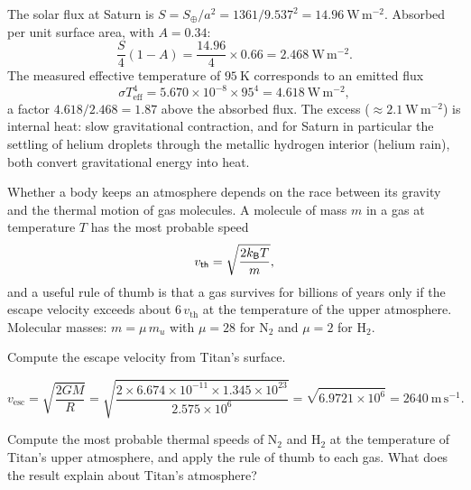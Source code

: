\begin{solution}
The solar flux at Saturn is $S = S_\oplus/a^2 = 1361/9.537^2 = 14.96\ \mathrm{W\,m^{-2}}$.
Absorbed per unit surface area, with $A = 0.34$:
\[
  \frac{S}{4}(1 - A) = \frac{14.96}{4} \times 0.66 = 2.468\ \mathrm{W\,m^{-2}}.
\]
The measured effective temperature of $95\ \mathrm{K}$ corresponds to an emitted flux
\[
  \sigma T_{\mathrm{eff}}^4 = 5.670 \times 10^{-8} \times 95^4 = 4.618\ \mathrm{W\,m^{-2}},
\]
a factor $4.618/2.468 = 1.87$ above the absorbed flux.
The excess ($\approx 2.1\ \mathrm{W\,m^{-2}}$) is internal heat: slow gravitational contraction, and for Saturn in particular the settling of helium droplets through the metallic hydrogen interior (helium rain), both convert gravitational energy into heat.
\end{solution}



Whether a body keeps an atmosphere depends on the race between its gravity and the thermal motion of gas molecules.
A molecule of mass $m$ in a gas at temperature $T$ has the most probable speed
\[
  v_{\mathsf{th}} = \sqrt{\frac{2 k_{\mathsf{B}} T}{m}},
\]
and a useful rule of thumb is that a gas survives for billions of years only if the escape velocity exceeds about $6\, v_{\mathrm{th}}$ at the temperature of the upper atmosphere.
Molecular masses: $m = \mu\, m_u$ with $\mu = 28$ for $\mathrm{N_2}$ and $\mu = 2$ for $\mathrm{H_2}$.

\parti {} Compute the escape velocity from Titan's surface.

\begin{solution}
\[
  v_{\mathrm{esc}} = \sqrt{\frac{2GM}{R}}
    = \sqrt{\frac{2 \times 6.674 \times 10^{-11} \times 1.345 \times 10^{23}}{2.575 \times 10^{6}}}
    = \sqrt{6.9721 \times 10^{6}} = 2640\ \mathrm{m\,s^{-1}}.
\]
\end{solution}

\parti {} Compute the most probable thermal speeds of $\mathrm{N_2}$ and $\mathrm{H_2}$ at the temperature of Titan's upper atmosphere, and apply the rule of thumb to each gas.
What does the result explain about Titan's atmosphere?

